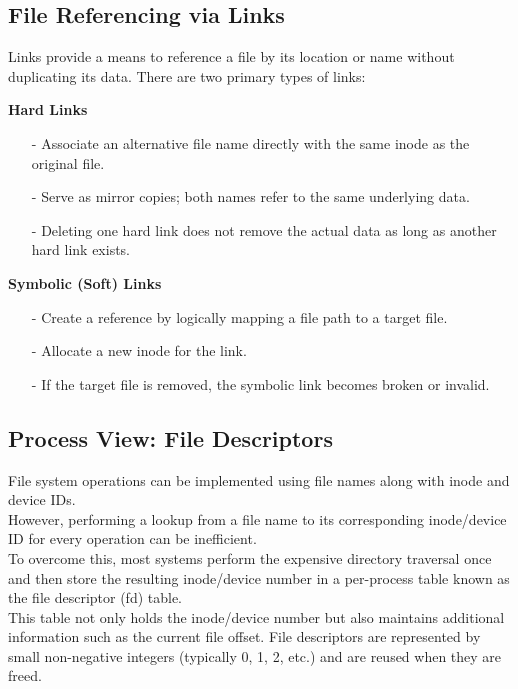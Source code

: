 \subsection{File Referencing via Links}
Links provide a means to reference a file by its location or name without duplicating its data. There are two primary types of links:

\begin{description}
  \item\textbf{Hard Links}
    \begin{itemize}
      \item[-] Associate an alternative file name directly with the same inode as the original file.
      \item[-] Serve as mirror copies; both names refer to the same underlying data.
      \item[-] Deleting one hard link does not remove the actual data as long as another hard link exists.
    \end{itemize}
    
  \item\textbf{Symbolic (Soft) Links}
    \begin{itemize}
      \item[-] Create a reference by logically mapping a file path to a target file.
      \item[-] Allocate a new inode for the link.
      \item[-] If the target file is removed, the symbolic link becomes broken or invalid.
    \end{itemize}
\end{description}

\subsection{Process View: File Descriptors}
File system operations can be implemented using file names along with inode and device IDs.\\ However, performing a lookup from a file name to its corresponding inode/device ID for every operation can be inefficient.\\
To overcome this, most systems perform the expensive directory traversal once and then store the resulting inode/device number in a per-process table known as the file descriptor (fd) table. \\

This table not only holds the inode/device number but also maintains additional information such as the current file offset. File descriptors are represented by small non-negative integers (typically 0, 1, 2, etc.) and are reused when they are freed.

